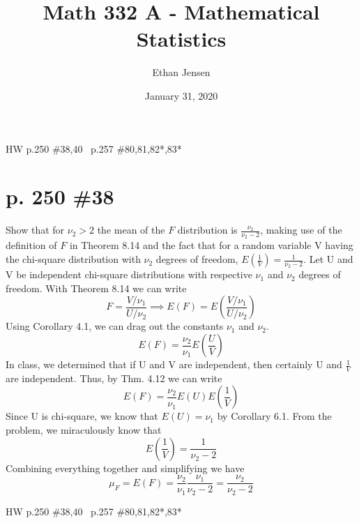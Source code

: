 \documentclass[12pt]{article}
\title{Math 332 A - Mathematical Statistics}
\author{Ethan Jensen}
\date{January 31, 2020}
\begin{document}
	\maketitle HW p.250 \#38,40 \ p.257 \#80,81,82*,83*
	\section[20pt]{p. 250 \#38}
	Show that for \(\nu_2>2\) the mean of the \(F\) distribution is \(\frac{\nu_2}{\nu_2-2}\), making use of the definition of \(F\) in Theorem 8.14 and the fact that for a random variable V having the chi-square distribution with \(\nu_2\) degrees of freedom, \newline
	\(E\left(\frac{1}{V}\right)=\frac{1}{\nu_2-2}\).
	\newline \newline
	Let U and V be independent chi-square distributions with respective \(\nu_1\) and \(\nu_2\) degrees of freedom. \newline \newline
	With Theorem 8.14 we can write
	\[F = \frac{V/\nu_1}{U/\nu_2} \implies E(F) = E\left(\frac{V/\nu_1}{U/\nu_2}\right)\]
	Using Corollary 4.1, we can drag out the constants \(\nu_1\) and \(\nu_2\). \newline
	\[E(F) = \frac{\nu_2}{\nu_1}E\left(\frac{U}{V}\right)\]
	In class, we determined that if U and V are independent, then certainly U and \(\frac{1}{V}\) are independent. \newline
	Thus, by Thm. 4.12 we can write
	\[E(F) = \frac{\nu_2}{\nu_1}E(U)E\left(\frac{1}{V}\right)\]
	Since U is chi-square, we know that \(E(U)=\nu_1\) by Corollary 6.1. \newline
	From the problem, we miraculously know that
	\[E\left(\frac{1}{V}\right)=\frac{1}{\nu_2-2}\]
	Combining everything together and simplifying we have
	\[\mu_F = E(F)=\frac{\nu_2}{\nu_1}\frac{\nu_1}{\nu_2-2}=\frac{\nu_2}{\nu_2-2}\]
	\newline
	\maketitle HW p.250 \#38,40 \ p.257 \#80,81,82*,83*
\end{document}
